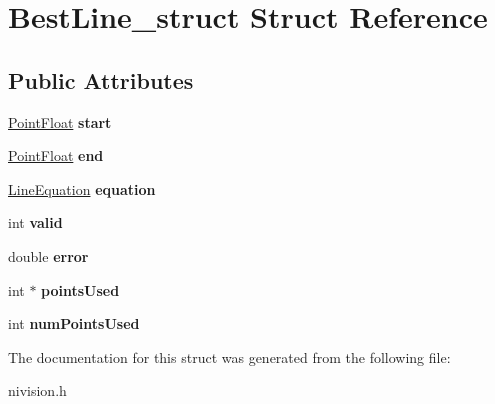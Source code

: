 \hypertarget{structBestLine__struct}{
\section{BestLine\_\-struct Struct Reference}
\label{structBestLine__struct}
}
\subsection*{Public Attributes}
\begin{DoxyCompactItemize}
\item 
\hypertarget{structBestLine__struct_a73354bc6823e1751d18f6b722e196100}{
\hyperlink{structPointFloat__struct}{PointFloat} {\bfseries start}}
\label{structBestLine__struct_a73354bc6823e1751d18f6b722e196100}

\item 
\hypertarget{structBestLine__struct_ad83b221a39020a4c9f4cc50b9b604e21}{
\hyperlink{structPointFloat__struct}{PointFloat} {\bfseries end}}
\label{structBestLine__struct_ad83b221a39020a4c9f4cc50b9b604e21}

\item 
\hypertarget{structBestLine__struct_a64da6085029db5a6b3be4f7d74a37aaa}{
\hyperlink{structLineEquation__struct}{LineEquation} {\bfseries equation}}
\label{structBestLine__struct_a64da6085029db5a6b3be4f7d74a37aaa}

\item 
\hypertarget{structBestLine__struct_a6eee4522fc87ef074f12c3ce92780e71}{
int {\bfseries valid}}
\label{structBestLine__struct_a6eee4522fc87ef074f12c3ce92780e71}

\item 
\hypertarget{structBestLine__struct_ab6021463d6f99397edf29ead4495d93a}{
double {\bfseries error}}
\label{structBestLine__struct_ab6021463d6f99397edf29ead4495d93a}

\item 
\hypertarget{structBestLine__struct_a564b4aa1e1cc1dc7363728bbdbd0bbc0}{
int $\ast$ {\bfseries pointsUsed}}
\label{structBestLine__struct_a564b4aa1e1cc1dc7363728bbdbd0bbc0}

\item 
\hypertarget{structBestLine__struct_ad50ae4e1a4a16021f5945eb3a1597cc5}{
int {\bfseries numPointsUsed}}
\label{structBestLine__struct_ad50ae4e1a4a16021f5945eb3a1597cc5}

\end{DoxyCompactItemize}


The documentation for this struct was generated from the following file:\begin{DoxyCompactItemize}
\item 
nivision.h\end{DoxyCompactItemize}
